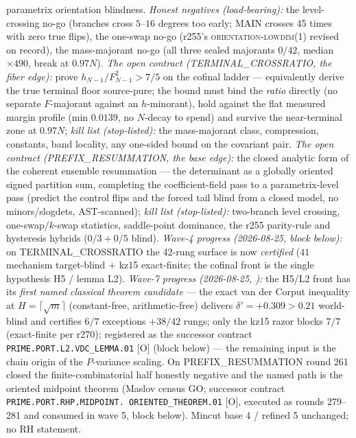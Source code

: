 {parametrix orientation blindness.  \emph{Honest negatives
(load-bearing):} the level-crossing no-go (branches cross
$5$--$16$ degrees too early; MAIN crosses 45 times with zero true
flips), the one-swap no-go (r255's \textsc{orientation-lowdim(1)}
revised on record), the mass-majorant no-go (all three sealed
majorants $0/42$, median $\times490$, break at $0.97N$).
\emph{The open contract (TERMINAL\_CROSSRATIO, the fiber edge):}
prove $h_{N-1}/F_{N-1}^2 > 7/5$ on the cofinal ladder ---
equivalently derive the true terminal floor source-pure; the
bound must bind the \emph{ratio} directly (no separate
$F$-majorant against an $h$-minorant), hold against the flat
measured margin profile (min $0.0139$, no $N$-decay to spend) and
survive the near-terminal zone at $0.97N$; \emph{kill list
(stop-listed):} the mass-majorant class, compression, constants,
band locality, any one-sided bound on the covariant pair.
\emph{The open contract (PREFIX\_RESUMMATION, the base edge):}
the closed analytic form of the coherent ensemble resummation ---
the determinant as a globally oriented signed partition sum,
completing the coefficient-field pass to a parametrix-level pass
(predict the control flips and the forced tail blind from a
closed model, no minors/slogdets, AST-scanned); \emph{kill list
(stop-listed):} two-branch level crossing, one-swap/$k$-swap
statistics, saddle-point dominance, the r255 parity-rule and
hysteresis hybrids ($0/3 + 0/5$ blind).  \emph{Wave-4 progress
(2026-08-25, block below):} on TERMINAL\_CROSSRATIO the 42-rung
surface is now \emph{certified} ($41$ mechanism target-blind $+$
kz15 exact-finite; the cofinal front is the single hypothesis H5
/ lemma L2).  \emph{Wave-7 progress (2026-08-25,
):} the H5/L2 front has
its \emph{first named classical theorem candidate} --- the exact
van der Corput inequality at $H = \lceil\sqrt{m}\rceil$
(constant-free, arithmetic-free) delivers $\delta' = +0.309 >
0.21$ world-blind and certifies $6/7$ exceptions $+ 38/42$
rungs; only the kz15 razor blocks $7/7$ (exact-finite per r270);
registered as the successor contract
\texttt{PRIME.PORT.L2.\allowbreak VDC\_LEMMA.01} [O] (block
below) --- the remaining input is the chain origin of the
$P$-variance scaling.  On PREFIX\_RESUMMATION round 261 closed the
finite-combinatorial half honestly negative and the named path is
the oriented midpoint theorem (Maslov census GO; successor
contract \texttt{PRIME.PORT.RHP.MIDPOINT.\allowbreak
ORIENTED\_THEOREM.01} [O], executed as rounds 279--281 and
consumed in wave 5, block below).  Mincut base 4 /
refined 5 unchanged; no RH statement.\par}


